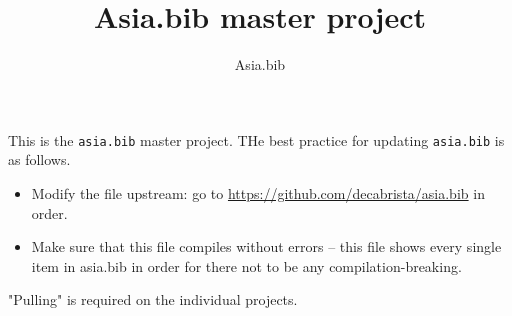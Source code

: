 \documentclass[xetex, svgnames, 12pt]{scrartcl}
\title{Asia.bib master project}
\author{Asia.bib}
\begin{document}
\maketitle

This is the \verb=asia.bib= master project. THe best practice for updating \verb=asia.bib= is as follows.

\begin{itemize}
\item Modify the file upstream: go to \url{https://github.com/decabrista/asia.bib} in order.
\item Make sure that this file compiles without errors -- this file shows every single item in asia.bib in order for there not to be any compilation-breaking.
\end{itemize}

"Pulling" is required on the individual projects.



\nocite{*} %



\end{document}
